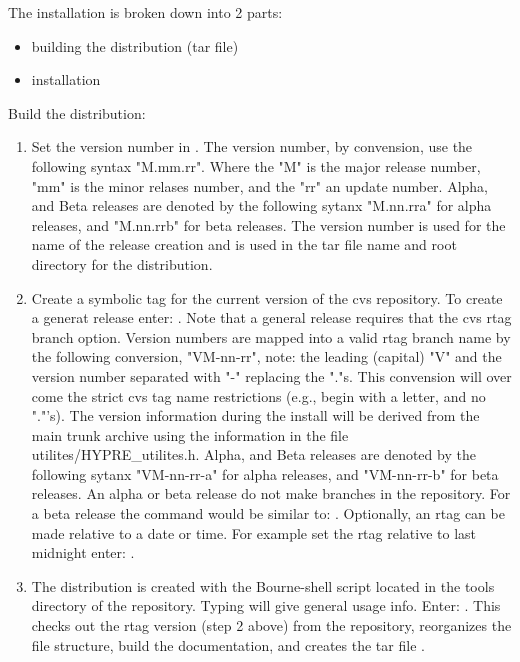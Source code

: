 The installation is broken down into 2 parts: 
  \begin{itemize}
  \item building the distribution (tar file)
  \item installation
  \end{itemize}

Build the \hypre{} distribution:

\begin{enumerate}

   \item Set the version number in .
   The version number, by convension, use the following syntax "M.mm.rr".
   Where the "M" is the major release number, "mm" is the minor
   relases number, and the "rr" an update number. Alpha, and Beta 
   releases are denoted by the following sytanx "M.nn.rra" for 
   alpha releases, and "M.nn.rrb" for beta releases. The version 
   number is used for the name of the release creation and is used
   in the tar file name and root directory for the distribution.

   \item Create a symbolic tag for the current version
   of the cvs repository. To create a generat release enter:
   . Note that a
   general release requires that the cvs rtag branch option.
   Version numbers are mapped into a valid rtag branch name by the
   following conversion, "VM-nn-rr", note: the leading (capital)
   "V" and the version number separated with "-" replacing
   the "."s. This convension will over come the strict cvs
   tag name restrictions (e.g., begin with a letter, and no "."'s).
   The version information during the install will be derived
   from the main trunk archive using the information in the
   file utilites/HYPRE\_utilites.h. Alpha, and Beta releases
   are denoted by the following sytanx "VM-nn-rr-a" for alpha
   releases, and "VM-nn-rr-b" for beta releases. An alpha or
   beta release do not make branches in the repository. For a beta
   release the command would be similar to: 
   . Optionally, an rtag
   can be made relative to a date or time. For example set the
   rtag relative to last midnight enter:
   .

   \item The distribution is created with the  
   Bourne-shell script located in the tools directory of the 
   \hypre{} repository.  Typing  will give 
   general usage info. Enter: . This checks 
   out the rtag version (step 2 above) from the repository,
   reorganizes the file structure, build the documentation,
   and creates the tar file .

\end{enumerate}

